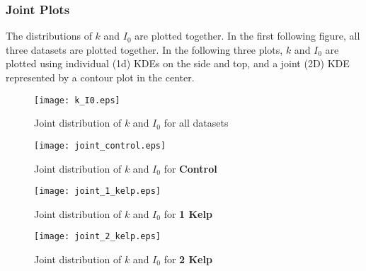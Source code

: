 \subsubsection{Joint Plots}

The distributions of $k$ and $I_0$ are plotted together. In the first following figure, all three datasets are plotted together. In the following three plots, $k$ and $I_0$ are plotted using individual (1d) KDEs on the side and top, and a joint (2D) KDE represented by a contour plot in the center.

\begin{figure}[H]
	\centering
	\texttt{[image: k\_I0.eps]}
	\caption{Joint distribution of $k$ and $I_0$ for all datasets}
\end{figure}

\begin{figure}[H]
	\centering
	\texttt{[image: joint\_control.eps]}
	\caption{Joint distribution of $k$ and $I_0$ for \textbf{Control}}
	\label{joint_control}
\end{figure}

\begin{figure}[H]
	\centering
	\texttt{[image: joint\_1\_kelp.eps]}
	\caption{Joint distribution of $k$ and $I_0$ for \textbf{1 Kelp}}
	\label{joint_1_kelp}
\end{figure}

\begin{figure}[H]
	\centering
	\texttt{[image: joint\_2\_kelp.eps]}
	\caption{Joint distribution of $k$ and $I_0$ for \textbf{2 Kelp}}
	\label{joint_2_kelp}
\end{figure}

